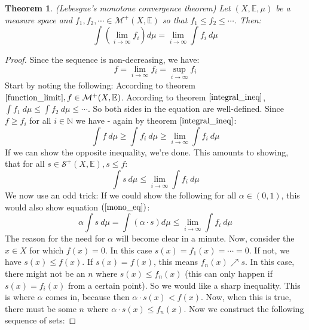 \documentclass[12pt, a4paper]{article}
\newtheorem{theorem}{Theorem}[section]
\numberwithin{equation}{section}
\begin{document}
\begin{theorem}
\label{monotone_convergence}
(Lebesgue's monotone convergence theorem) Let $(X,\mathbb{E},\mu)$ be a measure space and $f_1, f_2,\cdots\in\mathcal{M}^+(X,\mathbb{E})$ so that $f_1\le f_2\le \cdots$. Then:
\begin{equation}
\int\left(\underset{i\rightarrow\infty}{\lim}f_i\right)d\mu=\underset{i\rightarrow\infty}{\lim}\int f_i\ d\mu
\end{equation}
\end{theorem}
\begin{proof}
Since the sequence is non-decreasing, we have:
\begin{equation}
f=\underset{i\rightarrow\infty}{\lim}f_i=\underset{i\rightarrow\infty}{\sup}f_i
\end{equation}
Start by noting the following: According to theorem $\ref{function_limit}, f\in\mathcal{M}^+(X,\mathbb{E})$. According to theorem $\ref{integral_ineq}$, $\int f_1\ d\mu\le\int f_2\ d\mu\le\cdots$. So both sides in the equation are well-defined. Since $f\ge f_i$ for all $i\in\mathbb{N}$ we have - again by theorem $\ref{integral_ineq}$:
\begin{equation}
\int f\ d\mu\ge\int f_i\ d\mu\ge\underset{i\rightarrow\infty}{\lim}\int f_i\ d\mu
\end{equation}
If we can show the opposite inequality, we're done. This amounts to showing, that for all $s\in\mathcal{S}^+(X,\mathbb{E}), s\le f$:
\begin{equation}
\label{mono_eq}
\int s\ d\mu\le\underset{i\rightarrow\infty}{\lim}\int f_i\ d\mu
\end{equation} 
We now use an odd trick: If we could show the following for all $\alpha\in(0,1)$, this would also show equation $(\ref{mono_eq})$:
\begin{equation}
\alpha\int s\ d\mu=\int(\alpha\cdot s)d\mu\le\underset{i\rightarrow\infty}{\lim}\int f_i\ d\mu
\end{equation}
The reason for the need for $\alpha$ will become clear in a minute. Now, consider the $x\in X$ for which $f(x)=0$. In this case $s(x)=f_1(x)=\cdots=0$. If not, we have $s(x)\le f(x)$. If $s(x)=f(x)$, this means $f_n(x)\nearrow s$. In this case, there might not be an $n$ where $s(x)\le f_n(x)$ (this can only happen if $s(x)=f_i(x)$ from a certain point). So we would like a sharp inequality. This is where $\alpha$ comes in, because then $\alpha\cdot s(x)<f(x)$. Now, when this is true, there must be some $n$ where $\alpha\cdot s(x)\le f_n(x)$. Now we construct the following sequence of sets:

\end{proof}
\end{document}
